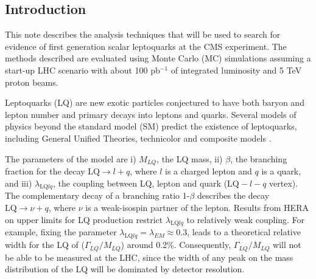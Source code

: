 \documentclass{cmspaper}
\begin{document}
\begin{linenumbers}
\section{Introduction}
 
This note describes the analysis techniques that will be used to search for evidence of first generation scalar leptoquarks 
at the CMS experiment. The methods described are evaluated using Monte Carlo (MC) simulations assuming a start-up LHC scenario
with about 100 pb$^{-1}$ of integrated luminosity and 5 TeV proton beams.

Leptoquarks (LQ) are new exotic particles conjectured to have both baryon and lepton number and primary decays into leptons and quarks.    
Several models of physics beyond the standard model (SM) predict the existence of leptoquarks, including General Unified Theories, 
technicolor and composite models \cite{theories}.  

The parameters of the model are i) $M_{LQ}$, the LQ mass, ii) $\beta$, the branching fraction for the decay 
$\mbox{LQ} \rightarrow l + q$, where $l$ is a charged lepton and $q$ is a quark, and
iii) $\lambda_{\mbox{LQ}lq}$, the coupling between LQ, lepton and quark ($\mbox{LQ}-l-q$ vertex). 
The complementary decay of a branching ratio 1-$\beta$ describes the decay $\mbox{LQ} \rightarrow \nu + q$, 
where $\nu$ is a weak-isospin partner of the lepton.
Results from HERA on upper limits for LQ production restrict  
$\lambda_{\mbox{LQ}lq}$ to relatively weak coupling\cite{hera}. For example, fixing the parameter 
$\lambda_{\mbox{LQ}lq} = \lambda_{EM} \approx 0.3$, leads to 
a theoretical relative width for the LQ of ($\Gamma_{LQ}/M_{LQ}$) around 0.2\%. 
Consequently, $\Gamma_{LQ}/M_{LQ}$ will not be able to be measured at the LHC, since 
the width of any peak on the mass distribution of the LQ will be dominated by detector resolution.  


\end{linenumbers}
\end{document}
